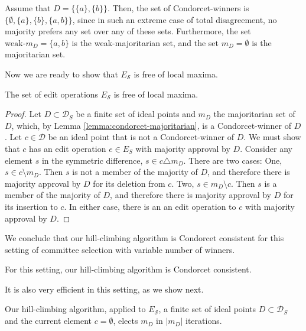 \documentclass[sigconf]{aamas}  %
\newcommand{\calD}{\mathcal{D}}
\newcommand{\calS}{\mathcal{S}}
\begin{document}
\begin{example}
%
Assume that $D = \{ \{a\}, \{b\} \}$.
Then, the set of Condorcet-winners is
$\{ \emptyset, \{a\}, \{b\}, \{a,b\} \}$, since in such an extreme case of total disagreement, no majority prefers any set over any of these sets.
Furthermore, the set $\textrm{weak-}m_D = \{a, b\}$ is the weak-majoritarian set, and the set $m_D = \emptyset$ is the majoritarian set.
%
\end{example}

Now we are ready to show that $E_\calS$ is free of local maxima.

\begin{lemma}
  The set of edit operations $E_\calS$ is free of local maxima.
\end{lemma}

\begin{proof}
%
Let $D \subset \calD_S$ be a finite set of ideal points and $m_D$ the majoritarian set of $D$, which, by Lemma \ref{lemma:condorcet-majoritarian}, is a Condorcet-winner of $D$.  Let $c \in \calD$ be an ideal point that is not a Condorcet-winner of $D$. We must show that
$c$ has an edit operation $e \in E_S$ with majority approval by $D$. Consider any  element $s$ in the symmetric difference,  $s \in c \triangle m_D$.
There are two cases: One, $s \in c \setminus m_D$. Then $s$ is not a member of the majority of $D$, and therefore there is majority approval by $D$ for its deletion from $c$.
Two, $s \in m_D \setminus c$. Then $s$ is a member of the majority of $D$, and therefore there is majority approval by $D$ for its insertion to  $c$. In either case, there is an an edit operation to $c$ with majority approval by $D$.
%
\end{proof}

We conclude that our hill-climbing algorithm is Condorcet consistent for this setting of committee selection with variable number of winners.

\begin{corollary}
  For this setting, our hill-climbing algorithm is Condorcet consistent.
\end{corollary}

It is also very efficient in this setting, as we show next.

\begin{lemma}
Our hill-climbing algorithm, applied to $E_\calS$,  a finite set of ideal points $D \subset \calD_S$ and the current element $c = \emptyset$, elects $m_D$ in $|m_D|$ iterations.
\end{lemma}
\end{document}
